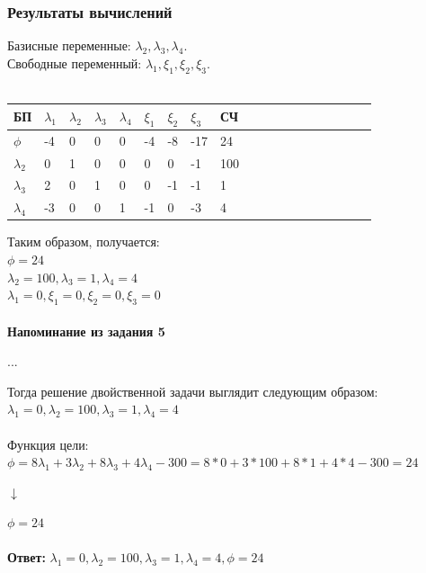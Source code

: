 \documentclass[14pt,a4paper,fleqn]{extarticle}
\begin{document}
\subsubsection*{Результаты вычислений}
Базисные переменные: $\lambda_2, \lambda_3, \lambda_4$.\\
Свободные переменный: $\lambda_1, \xi_1, \xi_2, \xi_3$.\\\\
\begin{tabularx}{\textwidth}{V{1}p{1.2cm}V{1}p{1.2cm}V{1}p{1.2cm}V{1}p{1.26cm}V{1}p{1.2cm}V{1}p{1.2cm}V{1}p{1.2cm}V{1}p{1.2cm}V{1}p{1.5cm}V{1}}
	\hline
	
	БП & $\lambda_1$ & $\lambda_2$ & $\lambda_3$ & $\lambda_4$ & $\xi_1$ & $\xi_2$ & $\xi_3$ & СЧ\\
	
	\hline
	
	$\phi$ & -4 & 0 & 0 & 0 & -4 & -8 & -17 & 24\\
	
	\hline
	
	$\lambda_2$ & 0 & 1 & 0 & 0 & 0 & 0 & -1 & 100\\
	
	\hline
	
	$\lambda_3$ & 2 & 0 & 1 & 0 & 0 & -1 & -1 & 1\\
	
	\hline
	
	$\lambda_4$ & -3 & 0 & 0 & 1 & -1 & 0 & -3 & 4\\
	
	\hline
\end{tabularx}
\newline\newline
Таким образом, получается:\\
$\phi = 24$\\
$\lambda_2 = 100, \lambda_3 = 1, \lambda_4 = 4$\\
$\lambda_1 = 0, \xi_1 = 0, \xi_2 = 0, \xi_3 = 0$\\
\noindent\makebox[\linewidth]{\rule{\paperwidth}{0.4pt}}\\
\textbf{Напоминание из задания 5}
\begin{center}
	...
\end{center}
Тогда решение двойственной задачи выглядит следующим образом:\\
$\lambda_1 = 0, \lambda_2 = 100, \lambda_3 = 1, \lambda_4 = 4$\\\\
Функция цели:\\
$\phi = 8\lambda_1 + 3\lambda_2 + 8\lambda_3 + 4\lambda_4 - 300 = 8*0 + 3*100 + 8*1 + 4*4 - 300 = 24$
\begin{center}$\downarrow$\end{center}
$\phi = 24$\\
\noindent\makebox[\linewidth]{\rule{\paperwidth}{0.4pt}}\\
\textbf{Ответ:} $\lambda_1 = 0, \lambda_2 = 100, \lambda_3 = 1, \lambda_4 = 4, \phi = 24$
\end{document}
